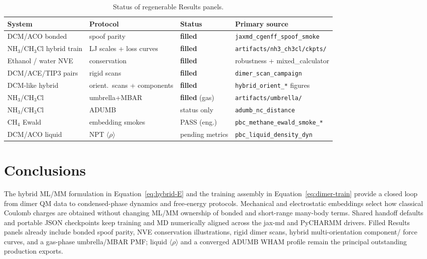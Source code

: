 \documentclass[journal=jctc,manuscript=article]{achemso}
\begin{document}
\begin{table}[h]
\caption{Status of regenerable Results panels.}
\label{tab:matrix}
\begin{tabular}{llll}
\toprule
System & Protocol & Status & Primary source \\
\midrule
DCM/ACO bonded & spoof parity & \textbf{filled} & \texttt{jaxmd\_cgenff\_spoof\_smoke} \\
NH\(_3\)/CH\(_3\)Cl hybrid train & LJ scales + loss curves & \textbf{filled} & \texttt{artifacts/nh3\_ch3cl/ckpts/} \\
Ethanol / water NVE & conservation & \textbf{filled} & robustness + mixed\_calculator \\
DCM/ACE/TIP3 pairs & rigid scans & \textbf{filled} & \texttt{dimer\_scan\_campaign} \\
DCM-like hybrid & orient.\ scans + components & \textbf{filled} & \texttt{hybrid\_orient\_*} figures \\
NH\(_3\)/CH\(_3\)Cl & umbrella+MBAR & \textbf{filled} (gas) & \texttt{artifacts/umbrella/} \\
NH\(_3\)/CH\(_3\)Cl & ADUMB & status only & \texttt{adumb\_nc\_distance} \\
CH\(_4\) Ewald & embedding smokes & PASS (eng.) & \texttt{pbc\_methane\_ewald\_smoke\_*} \\
DCM/ACO liquid & NPT \(\langle\rho\rangle\) & pending metrics & \texttt{pbc\_liquid\_density\_dyn} \\
\bottomrule
\end{tabular}
\end{table}

\section{Conclusions}

The hybrid ML/MM formulation in Equation~\ref{eq:hybrid-E} and the training
assembly in Equation~\ref{eq:dimer-train} provide a closed loop from dimer QM
data to condensed-phase dynamics and free-energy protocols. Mechanical and
electrostatic embeddings select how classical Coulomb charges are obtained
without changing ML/MM ownership of bonded and short-range many-body terms.
Shared handoff defaults and portable JSON checkpoints keep training and MD
numerically aligned across the jax-md and PyCHARMM drivers. Filled Results panels already include bonded spoof parity, NVE conservation
illustrations, rigid dimer scans, hybrid multi-orientation component/
force curves, and a gas-phase umbrella/MBAR PMF; liquid
\(\langle\rho\rangle\) and a converged ADUMB WHAM profile remain the principal
outstanding production exports.
\end{document}
